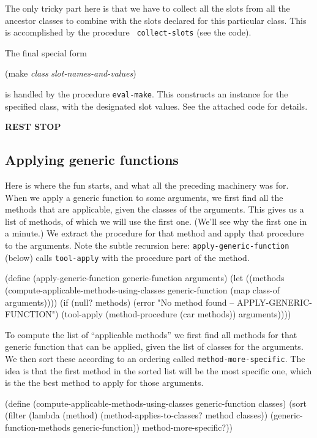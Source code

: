 The only tricky part here is that we have to collect all the slots from
all the ancestor classes to combine with the slots declared for this
particular class.  This is accomplished by the procedure {\tt
collect-slots} (see the code).

The final special form

\beginlisp
(make {\it class} {\it slot-names-and-values})
\endlisp

\noindent is handled by the procedure {\tt eval-make}.  This
constructs an instance for the specified class, with the designated slot
values.  See the attached code for details.

\smallskip
\begin{center}
{\bf REST STOP}
\end{center}
\smallskip

\subsection{Applying generic functions}

Here is where the fun starts, and what all the preceding machinery was
for.  When we apply a generic function to some arguments, we first
find all the methods that are applicable, given the classes of the
arguments.  This gives us a list of methods, of which we will use the
first one.  (We'll see why the first one in a minute.)  We extract the
procedure for that method and apply that procedure to the arguments.
Note the subtle recursion here: {\tt apply-generic-function} (below)
calls {\tt tool-apply} with the procedure part of the method.

\beginlisp
(define (apply-generic-function generic-function arguments)
  (let ((methods (compute-applicable-methods-using-classes
                  generic-function
                  (map class-of arguments))))
    (if (null? methods)
        (error "No method found -- APPLY-GENERIC-FUNCTION")
        (tool-apply (method-procedure (car methods)) arguments))))
\endlisp


To compute the list of ``applicable methods'' we first find all
methods for that generic function that can be applied, given the list
of classes for the arguments.  We then sort these according to an
ordering called {\tt method-more-specific}.  The idea is that the
first method in the sorted list will be the most specific one, which
is the the best method to apply for those arguments.

\beginlisp
(define (compute-applicable-methods-using-classes generic-function classes)
  (sort
   (filter
    (lambda (method)
      (method-applies-to-classes? method classes))
    (generic-function-methods generic-function))
   method-more-specific?))
\endlisp


